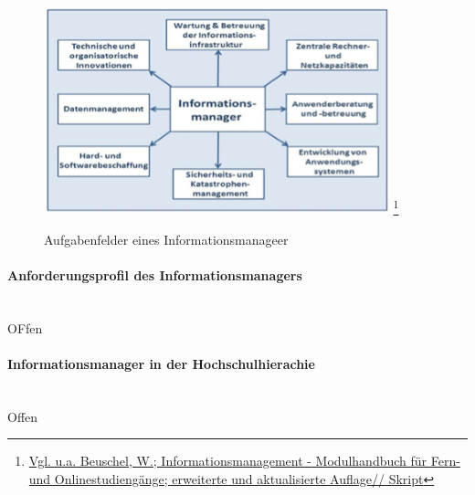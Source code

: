 \documentclass[a4paper, 12pt]{scrreprt}
\begin{document}
\begin{figure}[h!]
	\centering
	\includegraphics[width=10cm]{bilder_olli/aufgabenfelder_des_cio} \footnote{\url{Vgl. u.a. Beuschel, W.; Informationsmanagement - Modulhandbuch für Fern- und Onlinestudiengänge; erweiterte und aktualisierte Auflage// Skript}}
	\caption{Aufgabenfelder eines Informationsmanageer}
	\label{cio}
\end{figure}




\paragraph{Anforderungsprofil des Informationsmanagers}\mbox{}\\
OFfen

\paragraph{Informationsmanager in der Hochschulhierachie}\mbox{}\\
Offen
\end{document}

